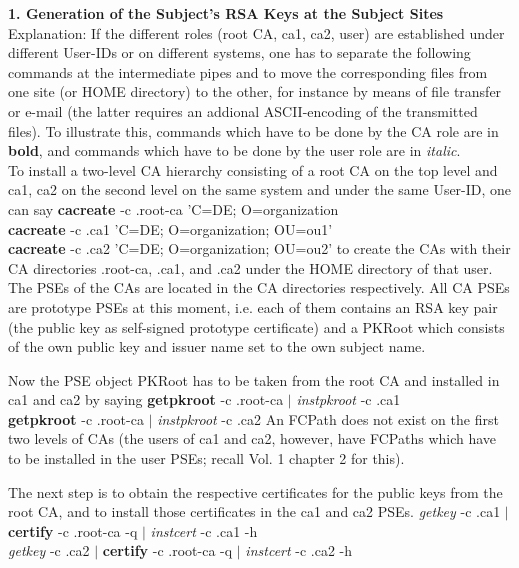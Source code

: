 {\bf 1. Generation of the Subject's RSA Keys at the Subject Sites}
\\ [1em]
{\small
Explanation: If the different roles (root CA, ca1, ca2, user) are established under different 
User-IDs or on different systems, one has to separate the following commands at the 
intermediate pipes and to move the corresponding files from one site (or
HOME directory) to the other, for instance by means of file transfer or e-mail (the
latter requires an addional ASCII-encoding of the transmitted files).
To illustrate this, commands which have to
be done by the CA role are in {\bf bold}, and commands which have to be done
by the user role are in {\em italic}.
}
\\ [1em]
To install a two-level CA hierarchy consisting of a root CA on the top level and ca1, ca2
on the second level on the same system and under the same User-ID, one can say
\bvtab
\1 {\bf cacreate} -c .root-ca 'C=DE; O=organization \\
\1 {\bf cacreate} -c .ca1 'C=DE; O=organization; OU=ou1' \\
\1 {\bf cacreate} -c .ca2 'C=DE; O=organization; OU=ou2'
\evtab
to create the CAs with their CA directories .root-ca, .ca1, and .ca2 under the HOME directory
of that user. The PSEs of the CAs are located in the CA directories respectively.
All CA PSEs are prototype PSEs at this moment, i.e. each of them contains an RSA key pair 
(the public key as self-signed prototype certificate) and a PKRoot which consists
of the own public key and issuer name set to the own subject name. 

Now the PSE object PKRoot has to be taken from the root CA and installed in ca1 and ca2 by saying
\bvtab
\1 {\bf getpkroot} -c .root-ca $|$ {\em instpkroot} -c .ca1 \\
\1 {\bf getpkroot} -c .root-ca $|$ {\em instpkroot} -c .ca2
\evtab
An FCPath does not exist on the first two levels of CAs (the users of ca1 and ca2, however,
have FCPaths which have to be installed in the user PSEs; recall Vol. 1 chapter 2 for this).
 
The next step is to obtain the
respective certificates for the public keys from the root CA, and to install those 
certificates in the ca1 and ca2 PSEs.
\bvtab
\1 {\em getkey} -c .ca1 $|$ {\bf certify} -c .root-ca -q $|$ {\em instcert} -c .ca1 -h \\
\1 {\em getkey} -c .ca2 $|$ {\bf certify} -c .root-ca -q $|$ {\em instcert} -c .ca2 -h \\
\evtab


